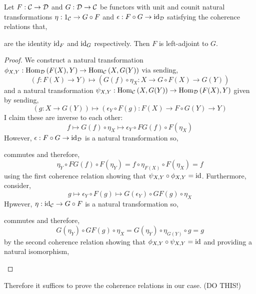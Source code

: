 \documentclass[12pt]{article}
\begin{document}
\begin{prop}
Let $F : \mathcal{C} \to \mathcal{D}$ and $G : \mathcal{D} \to \mathcal{C}$ be functors with unit and counit natural transformations $\eta : 1_{\mathcal{C}} \to G \circ F$ and $\epsilon : F \circ G \to \mathrm{id}_{\mathcal{D}}$ satisfying the coherence relations that,
\begin{center}
\end{center}
are the identity $\mathrm{id}_F$ and $\mathrm{id}_G$ respectively. 
Then $F$ is left-adjoint to $G$.
\end{prop}

\begin{proof}
We construct a natural transformation $\phi_{X,Y} : \mathrm{Hom}_{\mathcal{D}} \left( F(X), Y \right) \to \mathrm{Hom}_{\mathcal{C}} \left( X, G(Y) \right)$ via sending,
\[ (f : F(X) \to Y) \mapsto (G(f) \circ \eta_X : X \to G\circ F(X) \to G(Y))\]
and a natural transformation $\psi_{X,Y} : \mathrm{Hom}_{\mathcal{C}} \left( X, G(Y) \right) \to \mathrm{Hom}_{\mathcal{D}} \left( F(X), Y \right)$ given by sending,
\[ (g : X \to G(Y)) \mapsto (\epsilon_Y \circ F(g) : F(X) \to F \circ G(Y) \to Y) \]
I claim these are inverse to each other:
\[ f \mapsto G(f) \circ \eta_X \mapsto \epsilon_Y \circ FG(f) \circ F(\eta_X) \]  
However, $\epsilon : F \circ G \to \mathrm{id}_{\mathcal{D}}$ is a natural transformation so,
\begin{center}
\end{center}
commutes and therefore,
\[ \eta_Y \circ FG(f) \circ F(\eta_Y) = f \circ \eta_{F(X)} \circ F(\eta_X) = f \]
using the first coherence relation showing that $\psi _{X,Y} \circ \phi_{X,Y} = \mathrm{id}$. Furthermore, consider,
\[ g \mapsto \epsilon_Y \circ F(g) \mapsto G(\epsilon_Y) \circ GF(g) \circ \eta_X  \]
Hpwever, $\eta : \mathrm{id}_{\mathcal{C}} \to G \circ F$ is a natural transformation so,
\begin{center}
\end{center}
commutes and therefore,
\[ G(\eta_Y) \circ GF(g) \circ \eta_X = G(\eta_Y) \circ \eta_{G(Y)} \circ g = g \]
by the second coherence relation showing that $\phi_{X,Y} \circ \psi_{X,Y} = \mathrm{id}$ and providing a natural isomorphism,
\begin{center}
\end{center}
\end{proof}
\noindent
Therefore it suffices to prove the coherence relations in our case. (DO THIS!)
\end{document}
